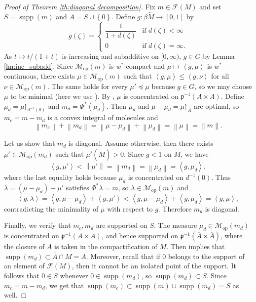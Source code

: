 \documentclass[a4paper,10pt]{amsart}
\DeclareMathOperator{\supp}{supp}                           %
\newcommand{\set}[1]{\left\{{#1}\right\}}                   %
\newcommand{\norm}[1]{\left\|{#1}\right\|}                  %
\newcommand{\duality}[1]{\left<{#1}\right>}                 %
\newcommand{\cl}[1]{\overline{#1}}                          %
\newcommand{\restrict}{\mathord{\upharpoonright}}           %
\newcommand{\lipfree}[1]{\mathcal{F}({#1})}                 %
\newcommand{\wt}[1]{\widetilde{#1}}                         %
\newcommand{\bwt}[1]{\beta\wt{#1}}                          %
\newcommand{\pp}{\mathfrak{p}}                              %
\newcommand{\opr}[1]{\mathcal{M}_{\mathrm{op}}(#1)}         %
\renewcommand{\leq}{\leqslant}
\theoremstyle{plain}
\theoremstyle{definition}
\theoremstyle{remark}
\begin{document}
\begin{proof}[Proof of Theorem \ref{th:diagonal decomposition}]
Fix $m\in\lipfree{M}$ and set $S=\supp(m)$ and $A=S\cup\set{0}$.
Define $g:\bwt{M}\to[0,1]$ by
\[
  g(\zeta) = \begin{cases} \dfrac{1}{1+d(\zeta)} & \text{if }d(\zeta) < \infty \\ 0 & \text{if }d(\zeta)=\infty.  \end{cases}
\]
As $t \mapsto t/(1+t)$ is increasing and subadditive on $[0,\infty)$, $g \in G$ by Lemma \ref{lm:inc_subadd}. Since $\opr{m}$ is $w^*$-compact and $\mu \mapsto \duality{g,\mu}$ is $w^*$-continuous, there exists $\mu \in \opr{m}$ such that $\duality{g,\mu} \leq \duality{g,\nu}$ for all $\nu \in \opr{m}$. The same holds for every $\mu'\preccurlyeq\mu$ because $g\in G$, so we may choose $\mu$ to be minimal (here we use \cite[Propositions 3.6 and 3.10]{Smith24}). By \cite[Corollary 5.6]{Smith24}, $\mu$ is concentrated on $\pp^{-1}(A\times A)$. Define $\mu_d = \mu\restrict_{d^{-1}(0)}$ and $m_d = \Phi^*(\mu_d)$. Then $\mu_d$ and $\mu-\mu_d=\mu\restrict_{\wt{A}}$ are optimal, so $m_c=m-m_d$ is a convex integral of molecules and
$$
\norm{m_c}+\norm{m_d}=\norm{\mu-\mu_d}+\norm{\mu_d}=\norm{\mu}=\norm{m} .
$$

Let us show that $m_d$ is diagonal. Assume otherwise, then there exists $\mu'\in\opr{m_d}$ such that $\mu'(\wt{M})>0$. Since $g<1$ on $\wt{M}$, we have
$$
\duality{g,\mu'}<\norm{\mu'}=\norm{m_d}=\norm{\mu_d}=\duality{g,\mu_d} ,
$$
where the last equality holds because $\mu_d$ is concentrated on $d^{-1}(0)$. Thus $\lambda=(\mu-\mu_d)+\mu'$ satisfies $\Phi^*\lambda=m$, so $\lambda\in\opr{m}$ and
\[
\duality{g,\lambda} = \duality{g,\mu-\mu_d} + \duality{g,\mu'} < \duality{g,\mu-\mu_d} + \duality{g,\mu_d} = \duality{g,\mu},
\]
contradicting the minimality of $\mu$ with respect to $g$. Therefore $m_d$ is diagonal.

Finally, we verify that $m_c,m_d$ are supported on $S$. The measure $\mu_d\in\opr{m_d}$ is concentrated on $\pp^{-1}(A\times A)$, and hence supported on $\pp^{-1}(\cl{A}\times\cl{A})$, where the closure of $A$ is taken in the compactification of $M$. Then \cite[Lemma 8]{Aliaga} implies that $\supp(m_d)\subset \cl{A}\cap M=A$. Moreover, recall that if $0$ belongs to the support of an element of $\lipfree{M}$, then it cannot be an isolated point of the support. It follows that $0\in S$ whenever $0\in\supp(m_d)$, so $\supp(m_d)\subset S$. Since $m_c=m-m_d$, we get that $\supp(m_c)\subset\supp(m)\cup\supp(m_d)=S$ as well.
\end{proof}
\end{document}
